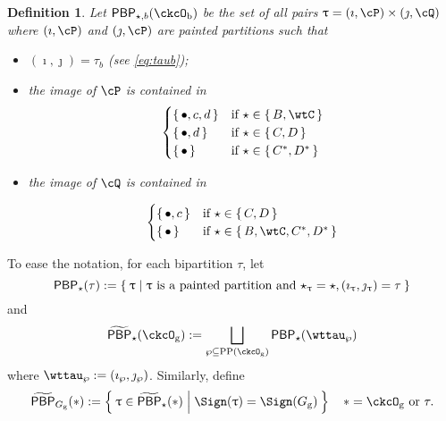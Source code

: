 \documentclass[12pt,a4paper]{amsart}
\numberwithin{equation}{section}
\newtheorem{defn}[thm]{Definition}
\theoremstyle{remark}
\def\LC{{}^{\scriptscriptstyle L}\sC}
\def\CPP{\mathrm{PP}}
\def\tPBP{\widetilde{\mathsf{PBP}}}
\def\PBPsb{\mathsf{PBP}_{\star,b}}
\def\PBP{\mathsf{PBP}}
\def\ckcOb{\ckcO_{\mathrm b}}
\def\ckcOg{\ckcO_{\mathrm g}}
\def\Gg{G_{\mathrm g}}
\def\tPBP{\widetilde{\mathsf{PBP}}}
\def\PBPsb{\mathsf{PBP}_{\star,b}}
\begin{document}
\begin{defn}
  Let $\PBPsb(\ckcOb)$ be the set of all pairs
  $\uptau = (\imath,\cP)\times(\jmath,\cQ)$ where $(\imath,\cP)$ and
  $(\jmath,\cP)$ are painted partitions such that
  \begin{itemize}
    \item $(\imath,\jmath) = \tau_{b}$ (see \eqref{eq:taub});
    \item the image of $\cP$ is contained in
          \[
          \begin{cases}
            \set{\bullet, c,d}  & \text{if } \star\in \set{B,\wtC} \\
            \set{\bullet, d}  & \text{if } \star\in \set{C,D}\\
            \set{\bullet}  & \text{if } \star\in \set{C^{*},D^{*}}\\
          \end{cases}
          \]
    \item the image of $\cQ$ is contained in

          \[
          \begin{cases}
            \set{\bullet, c}  & \text{if } \star\in \set{C,D}\\
            \set{\bullet}  & \text{if } \star\in \set{B,\wtC, C^{*},D^{*}}\\
          \end{cases}
          \]
  \end{itemize}
\end{defn}

To ease the notation, for each bipartition $\tau$, let
\[
  \PBP_{\star}(\tau) := \Set{ \uptau|\uptau \text{ is a painted partition and
    } \star_{\uptau}=\star, (\imath_{\uptau},\jmath_{\uptau}) = \tau}
\]
and
\[
  \tPBP_{\star}(\ckcOg) := %
  \bigsqcup_{\wp \subseteq \CPP(\ckcOg)}\PBP_{\star}(\wttau_{\wp})
\]
where $\wttau_{\wp} := (\imath_{\wp},\jmath_{\wp})$. Similarly, define
\[
  \tPBP_{\Gg}(\ast):= \Set{\uptau\in \tPBP_{\star}(\ast )|\Sign(\uptau)= \Sign(\Gg)}  \quad
  \ast  = \ckcOg \text{ or } \tau.
\]
\end{document}
